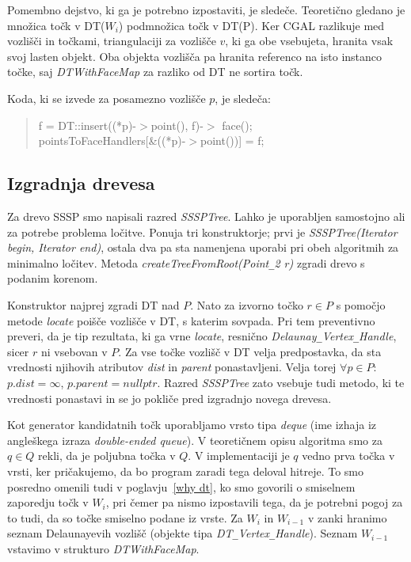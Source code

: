\documentclass[a4paper, 12pt]{book}
\newcommand{\U}{\texttt{\_}}
\begin{document}
Pomembno dejstvo, ki ga je potrebno izpostaviti, je sledeče. Teoretično gledano je množica točk v DT($W_i$) podmnožica točk v DT(P). Ker CGAL razlikuje med vozlišči in točkami, triangulaciji za vozlišče $v$, ki ga obe vsebujeta, hranita vsak svoj lasten objekt. Oba objekta vozlišča pa hranita referenco na isto instanco točke, saj \textit{DTWithFaceMap} za razliko od DT ne sortira točk.


Koda, ki se izvede za posamezno vozlišče $p$, je sledeča:

\begin{quote}
f = DT::insert((*p)-$>$point(), f)-$>$ face();\\
pointsToFaceHandlers[\&((*p)-$>$point())] = f;
\end{quote}

\subsection{Izgradnja drevesa} 

Za drevo SSSP smo napisali razred \textit{SSSPTree}. Lahko je uporabljen samostojno ali za potrebe problema ločitve. Ponuja tri konstruktorje; prvi je \textit{SSSP\-Tree(Iterator begin, Iterator end)}, ostala dva pa sta namenjena uporabi pri obeh algoritmih za minimalno ločitev. Metoda \textit{createTreeFromRoot\-(Point\U 2 r)} zgradi drevo s podanim korenom. 

Konstruktor najprej zgradi DT nad $P$. Nato za izvorno točko $r\in P$ s pomočjo metode \textit{locate} poišče vozlišče v DT, s katerim sovpada. Pri tem preventivno preveri, da je tip rezultata, ki ga vrne \textit{locate}, resnično \textit{Delaunay\U Ver\-tex\U Handle}, sicer $r$ ni vsebovan v $P$. Za vse točke vozlišč v DT velja predpostavka, da sta vrednosti njihovih atributov \textit{dist} in \textit{parent} ponastavljeni. Velja torej $\forall p\in P:$ $p.dist = \infty$,  $p.parent = nullptr$. Razred \textit{SSSPTree} zato vsebuje tudi metodo, ki te vrednosti ponastavi in se jo pokliče pred izgradnjo novega drevesa.

Kot generator kandidatnih točk uporabljamo vrsto tipa \textit{deque} (ime izhaja iz angleškega izraza \textit{double-ended queue}). V teoretičnem opisu algoritma smo za $q\in Q$ rekli, da je poljubna točka v $Q$. V implementaciji je $q$ vedno prva točka v vrsti, ker pričakujemo, da bo program zaradi tega deloval hitreje. To smo posredno omenili tudi v poglavju~\ref{why dt}, ko smo govorili o smiselnem zaporedju točk v $W_i$, pri čemer pa nismo izpostavili tega, da je potrebni pogoj za to tudi, da so točke smiselno podane iz vrste. Za $W_i$ in $W_{i-1}$ v zanki hranimo seznam Delaunayevih vozlišč (objekte tipa \textit{DT\U Vertex\U Handle}). Seznam $W_{i-1}$ vstavimo v strukturo \textit{DTWithFaceMap}. 
\end{document}
